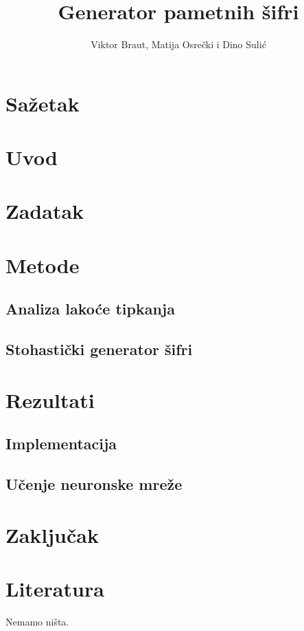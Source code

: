 \documentclass[a4paper,twocolumn,dvipdfm]{article}
\begin{document}
\title{Generator pametnih \v{s}ifri}
\author{Viktor Braut, Matija Osre\v{c}ki i Dino Suli\'c}
\maketitle

\section*{Sa\v{z}etak}

\section{Uvod}

\section{Zadatak}

\section{Metode}

\subsection{Analiza lako\'ce tipkanja}

\subsection{Stohasti\v{c}ki generator \v{s}ifri}

\section{Rezultati}

\subsection{Implementacija}

\subsection{U\v{c}enje neuronske mre\v{z}e}

\section{Zaklju\v{c}ak}

\section*{Literatura}

Nemamo ni\v{s}ta.
\end{document}
